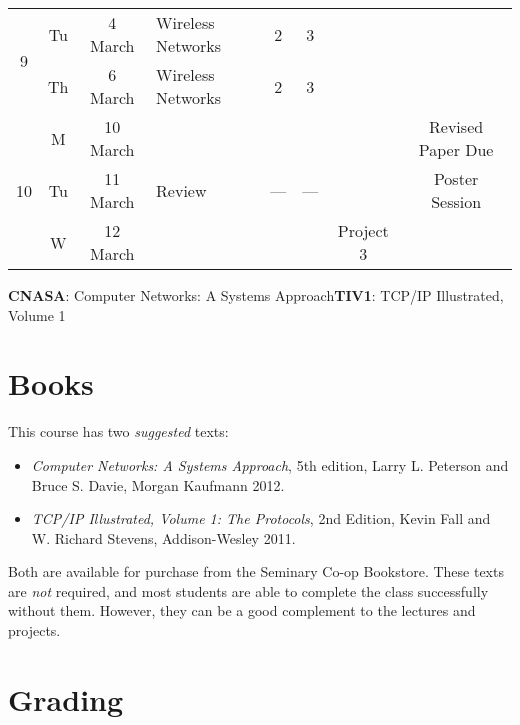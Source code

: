 \documentclass[11pt]{article}
\begin{document}
\begin{sidewaystable}
\begin{tabular}{|c|cc||p{6cm}|c|c|c|c|}
\multirow{2}{*}{9}  & Tu & 4 March      & Wireless Networks                               & 2    & 3       & \cellcolor[gray]{0.9}  & \cellcolor[gray]{0.9} \\\cline{2-6}
                    & Th & 6 March      & Wireless Networks                               & 2    & 3       & \cellcolor[gray]{0.9}  & \cellcolor[gray]{0.9} \\\hline\hline

\multirow{3}{*}{10} & M  & 10 March     & \cellcolor[gray]{0.9} & \cellcolor[gray]{0.9} & \cellcolor[gray]{0.9} &  \cellcolor[gray]{0.9} & Revised Paper Due \\\cline{2-7}
                    & Tu & 11 March     & Review                                          & ---  & ---     & \cellcolor[gray]{0.9}  & Poster Session \\\cline{2-7}
                    & W  & 12 March     & \cellcolor[gray]{0.9} & \cellcolor[gray]{0.9} & \cellcolor[gray]{0.9} &  Project 3 & \cellcolor[gray]{0.9} \\\hline
\end{tabular}
\begin{center}
\textbf{CNASA}: Computer Networks: A Systems Approach\hspace{3ex}\textbf{TIV1}: TCP/IP Illustrated, Volume 1
\end{center}
\label{tab:calendar}
\end{sidewaystable}


\section{Books}

This course has two \emph{suggested} texts:

\begin{itemize}
 \item \emph{Computer Networks: A Systems Approach}, 5th edition, Larry L. Peterson and Bruce S. Davie, Morgan Kaufmann 2012.
 \item \emph{TCP/IP Illustrated, Volume 1: The Protocols}, 2nd Edition, Kevin Fall and W. Richard Stevens, Addison-Wesley 2011.
\end{itemize}

Both are available for purchase from the Seminary Co-op Bookstore. These texts are \emph{not} required, and most students are able to complete the class successfully without them. However, they can be a good complement to the lectures and projects.

  
\section{Grading}
\end{document}
